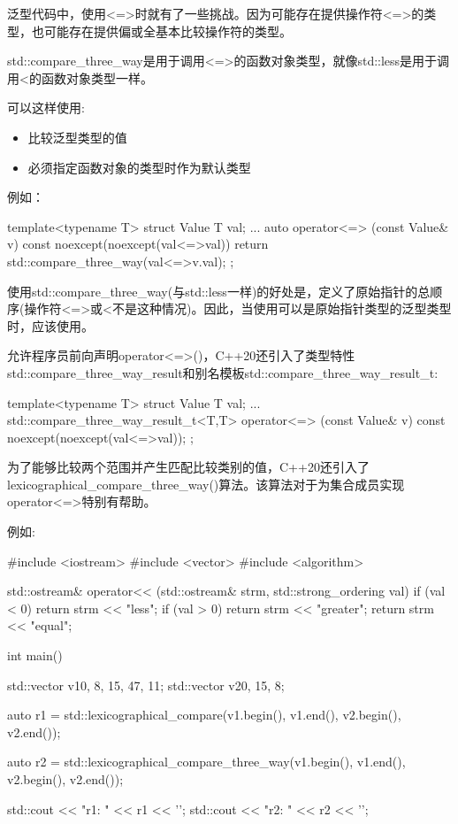 
泛型代码中，使用<=>时就有了一些挑战。因为可能存在提供操作符<=>的类型，也可能存在提供偏或全基本比较操作符的类型。


std::compare\_three\_way是用于调用<=>的函数对象类型，就像std::less是用于调用<的函数对象类型一样。

可以这样使用:

\begin{itemize}
\item
比较泛型类型的值

\item
必须指定函数对象的类型时作为默认类型
\end{itemize}

例如：

\begin{cpp}
template<typename T>
struct Value {
	T val{};
	...
	auto operator<=> (const Value& v) const noexcept(noexcept(val<=>val)) {
		return std::compare_three_way{}(val<=>v.val);
	}
};
\end{cpp}

使用std::compare\_three\_way(与std::less一样)的好处是，定义了原始指针的总顺序(操作符<=>或<不是这种情况)。因此，当使用可以是原始指针类型的泛型类型时，应该使用。

允许程序员前向声明operator<=>()，C++20还引入了类型特性std::compare\_three\_way\_result和别名模板std::compare\_three\_way\_result\_t:

\begin{cpp}
template<typename T>
struct Value {
	T val{};
	...
	std::compare_three_way_result_t<T,T>
		operator<=> (const Value& v) const noexcept(noexcept(val<=>val));
};
\end{cpp}


为了能够比较两个范围并产生匹配比较类别的值，C++20还引入了lexicographical\_compare\_three\_way()算法。该算法对于为集合成员实现operator<=>特别有帮助。

例如:


\begin{cpp}
#include <iostream>
#include <vector>
#include <algorithm>

std::ostream& operator<< (std::ostream& strm, std::strong_ordering val)
{
	if (val < 0) return strm << "less";
	if (val > 0) return strm << "greater";
	return strm << "equal";
}

int main()
{
	std::vector v1{0, 8, 15, 47, 11};
	std::vector v2{0, 15, 8};
	
	auto r1 = std::lexicographical_compare(v1.begin(), v1.end(),
										   v2.begin(), v2.end());
										   
	auto r2 = std::lexicographical_compare_three_way(v1.begin(), v1.end(),
													 v2.begin(), v2.end());
													 
	std::cout << "r1: " << r1 << '\n';
	std::cout << "r2: " << r2 << '\n';
}
\end{cpp}

